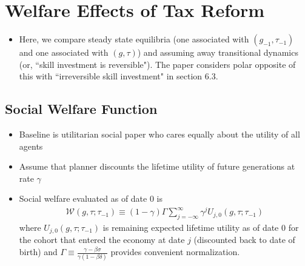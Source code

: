 \documentclass{article}
\begin{document}
\pagebreak

\section{Welfare Effects of Tax Reform}

\begin{itemize}
\item Here, we compare steady state equilibria (one associated with $(g_{-1}, \tau_{-1})$ and one associated with $(g, \tau)$) and assuming away transitional dynamics (or, ``skill investment is reversible"). The paper considers polar opposite of this with ``irreversible skill investment" in section 6.3.
\end{itemize}

\subsection{Social Welfare Function}

\begin{itemize}
\item Baseline is utilitarian social paper who cares equally about the utility of all agents
\item Assume that planner discounts the lifetime utility of future generations at rate $\gamma$
\item Social welfare evaluated as of date 0 is
\begin{align}
\mathcal{W}(g, \tau; \tau_{-1}) \equiv (1-\gamma) \Gamma \sum_{j = -\infty}^\infty \gamma^j U_{j,0} (g, \tau; \tau_{-1}) \label{swf}
\end{align}
where $U_{j,0} (g, \tau; \tau_{-1})$ is remaining expected lifetime utility as of date 0 for the cohort that entered the economy at date $j$ (discounted back to date of birth) and $\Gamma \equiv \frac{\gamma - \beta \sigma}{\gamma(1-\beta\delta)}$ provides convenient normalization.
\end{itemize}
\end{document}
